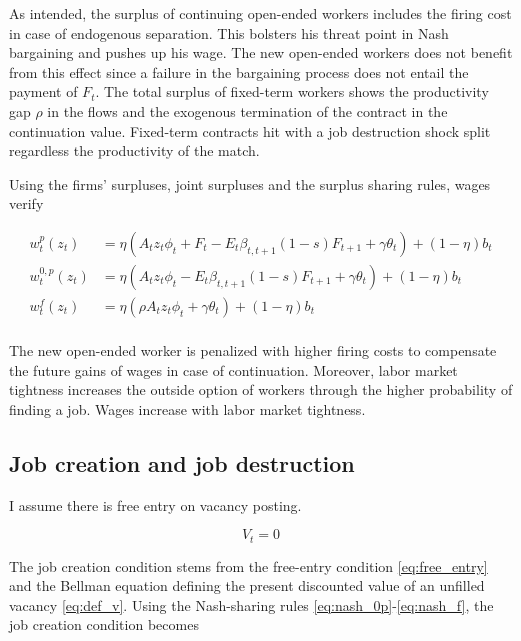 As intended, the surplus of continuing open-ended workers includes the firing cost in case of endogenous separation. This bolsters his threat point in Nash bargaining and pushes up his wage. The new open-ended workers does not benefit from this effect since a failure in the bargaining process does not entail the payment of $F_t$. The total surplus of fixed-term workers shows the productivity gap $\rho$ in the flows and the exogenous termination of the contract in the continuation value. Fixed-term contracts hit with a job destruction shock split regardless the productivity of the match.

Using the firms' surpluses, joint surpluses and the surplus sharing rules, wages verify

\begin{align}
w_t^p \left( z_t \right) &= \eta \left( A_t z_t \phi_t + F_t - E_t \beta_{t,t+1} (1-s) F_{t+1} + \gamma \theta_{t} \right) + (1-\eta) b_t \label{eq:wp}\\
w_t^{0,p} \left( z_t \right) &= \eta \left( A_t z_t \phi_t - E_t \beta_{t,t+1} (1-s) F_{t+1} + \gamma \theta_{t} \right) + (1-\eta) b_t\\
w_t^f \left( z_t \right) &= \eta \left( \rho A_t z_t \phi_t + \gamma \theta_{t} \right) + (1-\eta) b_t\\
\end{align}

The new open-ended worker is penalized with higher firing costs to compensate the future gains of wages in case of continuation. Moreover, labor market tightness increases the outside option of workers through the higher probability of finding a job. Wages increase with labor market tightness.

\subsection{Job creation and job destruction}

I assume there is free entry on vacancy posting.

\begin{equation}
V_t = 0 \label{eq:free_entry}
\end{equation}

The job creation condition stems from the free-entry condition \eqref{eq:free_entry} and the Bellman equation defining the present discounted value of an unfilled vacancy \eqref{eq:def_v}. Using the Nash-sharing rules \eqref{eq:nash_0p}-\eqref{eq:nash_f}, the job creation condition becomes

